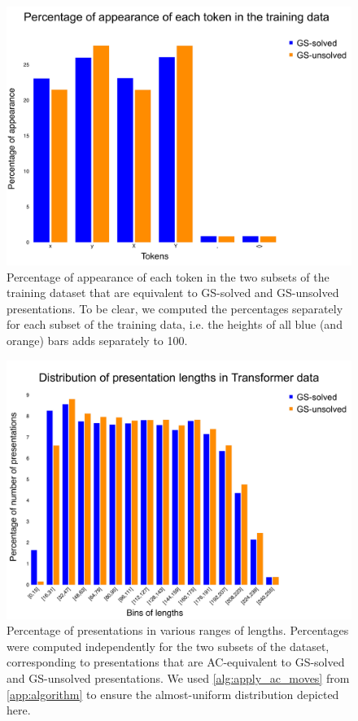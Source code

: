 \begin{figure}
	\centering
	\includegraphics[scale=0.15]{fig/tokens_hist.pdf}
	\caption{Percentage of appearance of each token in the two subsets of the training dataset that are equivalent to GS-solved and GS-unsolved presentations.
	To be clear, we computed the percentages separately for each subset of the training data, i.e. the heights of all blue (and orange) bars adds separately to 100.}
	\label{fig:tokens_hist}
\end{figure}

\begin{figure}
	\centering
	\includegraphics[scale=0.15]{fig/gpt_data_length_distribution.pdf}
	\caption{Percentage of presentations in various ranges of lengths.
	Percentages were computed independently for the two subsets of the dataset, corresponding to presentations that are AC-equivalent to GS-solved and GS-unsolved presentations.
	We used \cref{alg:apply_ac_moves} from \cref{app:algorithm} to ensure the almost-uniform distribution depicted here.}
	\label{fig:gpt_data}
\end{figure}

